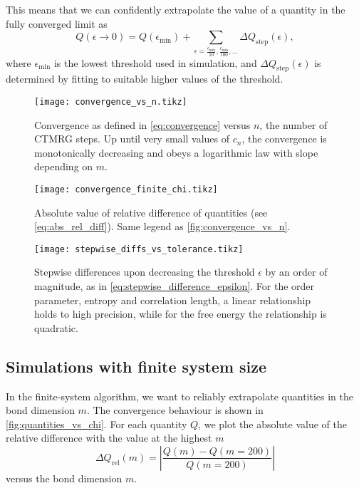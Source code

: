 
This means that we can confidently extrapolate the value of a quantity in the fully converged limit as
\begin{equation}\label{eq:extrapolation_fully_converged_limit_finite_m}
  Q(\epsilon \to 0) = Q(\epsilon_{\text{min}}) + \sum_{\epsilon = \frac{\epsilon_{\text{min}}}{10},
  \frac{\epsilon_{\text{min}}}{100}, \dots} \Delta Q_{\text{step}}(\epsilon),
\end{equation}
where $\epsilon_{\text{min}}$ is the lowest threshold used in simulation, and $\Delta Q_{\text{step}}(\epsilon)$ is determined
by fitting to suitable higher values of the threshold.

\begin{figure}
  \texttt{[image: convergence\_vs\_n.tikz]}
  \caption{Convergence as defined in \autoref{eq:convergence} versus $n$, the number of CTMRG
  steps.
  Up until very small values of $c_n$, the convergence is monotonically decreasing and obeys
  a logarithmic law with slope depending on $m$.}\label{fig:convergence_vs_n}
\end{figure}

\begin{figure}
  \texttt{[image: convergence\_finite\_chi.tikz]}
  \caption{Absolute value of relative difference of quantities (see \autoref{eq:abs_rel_diff}).
  Same legend as \autoref{fig:convergence_vs_n}.}\label{fig:convergence_finite_chi}
\end{figure}

\begin{figure}
  \texttt{[image: stepwise\_diffs\_vs\_tolerance.tikz]}
  \caption{Stepwise differences upon decreasing the threshold $\epsilon$ by an order of magnitude,
  as in \autoref{eq:stepwise_difference_epsilon}.
  For the order parameter, entropy and correlation length, a linear relationship holds to high precision,
  while for the free energy the relationship is quadratic.}\label{fig:stepwise_diffs_vs_tolerance}
\end{figure}

\subsection{Simulations with finite system size}
In the finite-system algorithm, we want to reliably extrapolate quantities in the bond dimension $m$.
The convergence behaviour is shown in \autoref{fig:quantities_vs_chi}.
For each quantity $Q$, we plot the absolute value of the relative difference with the value at the highest $m$
\begin{equation}\label{eq:abs_rel_diff_quantity_m}
  \Delta Q_{\text{rel}}(m) = \left| \frac{Q(m) - Q(m = 200)}{Q(m = 200)} \right|
\end{equation}
versus the bond dimension $m$.

